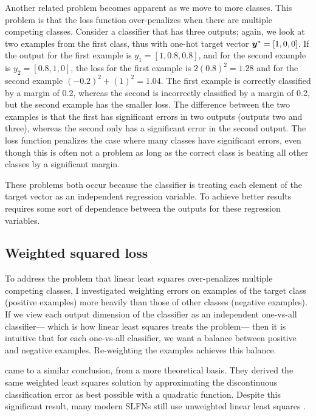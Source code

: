 Another related problem becomes apparent as we move to more classes.
This problem is that the loss function over-penalizes when
there are multiple competing classes.
Consider a classifier that has three outputs;
again, we look at two examples from the first class,
thus with one-hot target vector $\boldsymbol{y}^* = [1, 0, 0]$.
If the output for the first example is $y_1 = [1, 0.8, 0.8]$,
and for the second example is $y_2 = [0.8, 1, 0]$,
the loss for the first example is $2 (0.8)^2 = 1.28$
and for the second example $(-0.2)^2 + (1)^2 = 1.04$.
The first example is correctly classified by a margin of 0.2,
whereas the second is incorrectly classified by a margin of 0.2,
but the second example has the smaller loss.
The difference between the two examples is that
the first has significant errors in two outputs (outputs two and three),
whereas the second only has a significant error in the second output.
The loss function penalizes the case where many classes have significant errors,
even though this is often not a problem as long as the correct class
is beating all other classes by a significant margin.

These problems both occur because the classifier is treating each element
of the target vector as an independent regression variable.
To achieve better results
requires some sort of dependence
between the outputs for these regression variables.


\subsection{Weighted squared loss}

To address the problem that linear least squares
over-penalizes multiple competing classes,
I investigated weighting errors on examples of the target class (positive examples)
more heavily than those of other classes (negative examples).
If we view each output dimension of the classifier
as an independent one-vs-all classifier---%
which is how linear least squares treats the problem---%
then it is intuitive that for each one-vs-all classifier,
we want a balance between positive and negative examples.
Re-weighting the examples achieves this balance.

\textcite{Toh2008} came to a similar conclusion,
from a more theoretical basis.
They derived the same weighted least squares solution
by approximating the discontinuous classification error as best possible
with a quadratic function.
Despite this significant result,
many modern SLFNs still use unweighted linear least squares \parencite{McDonnell2015}.

